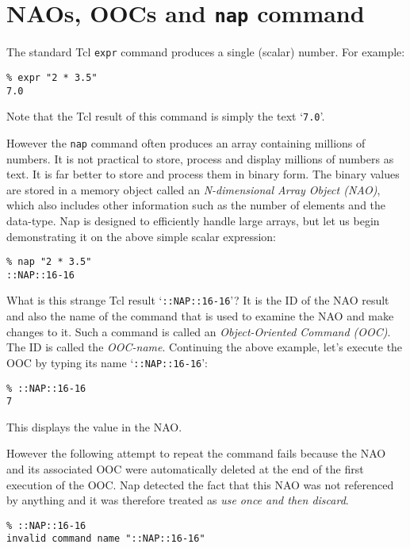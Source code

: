 
\section{NAOs, OOCs and \texttt{nap} command}

  The standard Tcl 
  \texttt{expr} command produces a single (scalar) number. For
  example:
  \begin{verbatim}
% expr "2 * 3.5"
7.0
\end{verbatim}

Note that the Tcl result of this command is simply the text
`\texttt{7.0}'.
  

However the 
  \texttt{nap} command often produces an array containing millions
  of numbers. It is not practical to store, process and display
  millions of numbers as text. It is far better to store and process
  them in binary form. The binary values are stored in a memory object
  called an 
  \emph{N-dimensional Array Object (NAO)}, which also includes other
  information such as the number of elements and the data-type. Nap is
  designed to efficiently handle large arrays, but let us begin
  demonstrating it on the above simple scalar expression:
  \begin{verbatim}
% nap "2 * 3.5"
::NAP::16-16
\end{verbatim}

What is this strange Tcl result `\texttt{::NAP::16-16}'? It is the ID of the NAO result and
  also the name of the command that is used to examine the NAO and make
  changes to it. Such a command is called an 
  \emph{Object-Oriented Command (OOC)}. The ID is called the 
  \emph{OOC-name}. Continuing the above example, let's execute
  the OOC by typing its name `\texttt{::NAP::16-16}':
  \begin{verbatim}
% ::NAP::16-16
7
\end{verbatim}

This displays the value in the NAO.
  

However the following attempt to repeat the command fails because
  the NAO and its associated OOC were automatically deleted at the end
  of the first execution of the OOC. Nap detected the fact that this
  NAO was not referenced by anything and it was therefore treated as 
  \emph{use once and then discard}.
  \begin{verbatim}
% ::NAP::16-16
invalid command name "::NAP::16-16"
\end{verbatim}

